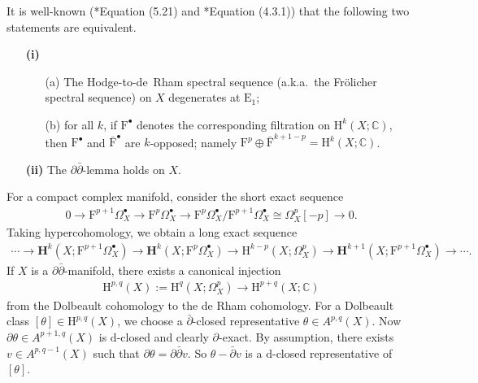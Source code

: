 It is well-known (\cite{1977-Deligne-Griffiths-Morgan-Sullivan-real-homotopy-theory-of-kahler-manifolds}*{Equation (5.21)}
and \cite{1971-Deligne-theorie-de-Hodge-II}*{Equation (4.3.1)})
that the following two statements 
are equivalent.
\begin{itemize}
\item[\textbf{(i)}] 
\begin{enumerate}
\item[(a)] The Hodge-to-de~Rham spectral sequence 
(a.k.a.~the Fr\"{o}licher spectral sequence)
on \(X\) degenerates at \(\mathrm{E}_{1}\);
\item[(b)] for all \(k\), if \(\mathrm{F}^{\bullet}\) denotes 
the corresponding filtration on \(\mathrm{H}^{k}(X;\mathbb{C})\),
then \(\mathrm{F}^{\bullet}\) and \(\bar{\mathrm{F}}^{\bullet}\) 
are \(k\)-opposed; namely
\(\mathrm{F}^{p}\oplus\bar{\mathrm{F}}^{k+1-p}=\mathrm{H}^{k}(X;\mathbb{C})\).
\end{enumerate} 

\item[\textbf{(ii)}] The \(\partial\bar{\partial}\)-lemma holds on \(X\).  
\end{itemize}

For a compact complex manifold, consider the short exact sequence
\begin{eqnarray}
0\to \mathrm{F}^{p+1}\Omega_{X}^{\bullet}\to
\mathrm{F}^{p}\Omega_{X}^{\bullet}\to \mathrm{F}^{p}\Omega_{X}^{\bullet}
\slash\mathrm{F}^{p+1}\Omega_{X}^{\bullet}\cong\Omega_{X}^{p}[-p]\to 0.
\end{eqnarray}
Taking hypercohomology, we obtain a long exact sequence
\begin{eqnarray*}
\cdots\to \mathbf{H}^{k}(X;\mathrm{F}^{p+1}\Omega_{X}^{\bullet})\to 
\mathbf{H}^{k}(X;\mathrm{F}^{p}\Omega_{X}^{\bullet})\to
\mathrm{H}^{k-p}(X;\Omega_{X}^{p})\to
\mathbf{H}^{k+1}(X;\mathrm{F}^{p+1}\Omega_{X}^{\bullet})\to\cdots.
\end{eqnarray*}
If \(X\) is a \(\partial\bar{\partial}\)-manifold, there exists a canonical injection
\begin{eqnarray*}
\mathrm{H}^{p,q}(X):=\mathrm{H}^{q}(X;\Omega_{X}^{p})\to \mathrm{H}^{p+q}(X;\mathbb{C})
\end{eqnarray*}
from the Dolbeault cohomology to the de Rham cohomology.
For a Dolbeault class \([\theta]\in\mathrm{H}^{p,q}(X)\), we choose a \(\bar{\partial}\)-closed
representative \(\theta\in A^{p,q}(X)\).
Now \(\partial\theta\in A^{p+1,q}(X)\) is \(\mathrm{d}\)-closed and clearly \(\partial\)-exact.
By assumption, there exists \(v\in A^{p,q-1}(X)\) such that 
\(\partial\theta=\partial\bar{\partial}v\). So \(\theta-\bar{\partial}v\)
is a \(\mathrm{d}\)-closed representative of \([\theta]\).

